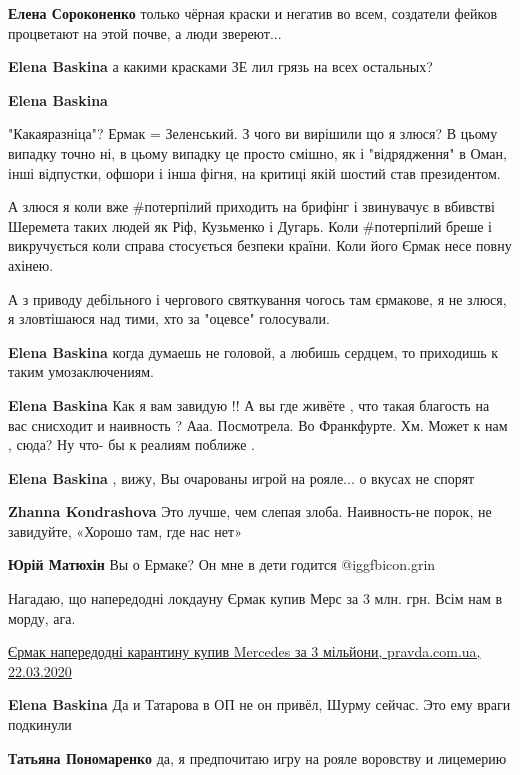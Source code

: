 \begin{itemize}
\begin{itemize}
\textbf{Елена Сороконенко} только чёрная краски и негатив во всем, создатели фейков процветают на этой почве, а люди звереют...

\textbf{Elena Baskina} а какими красками ЗЕ лил грязь на всех остальных?

\textbf{Elena Baskina} 

"Какаяразніца"? Ермак = Зеленський. З чого ви вирішили що я злюся? В цьому
випадку точно ні, в цьому випадку це просто смішно, як і "відрядження" в Оман,
інші відпустки, офшори і інша фігня, на критиці якій шостий став президентом.

А злюся я коли вже \#потерпілий приходить на брифінг і звинувачує в вбивстві
Шеремета таких людей як Ріф, Кузьменко і Дугарь. Коли #потерпілий бреше і
викручується коли справа стосується безпеки країни. Коли його Єрмак несе повну
ахінею.

А з приводу дебільного і чергового святкування чогось там єрмакове, я не злюся,
я зловтішаюся над тими, хто за "оцевсе" голосували.


\textbf{Elena Baskina} когда думаешь не головой, а любишь сердцем, то приходишь к таким умозаключениям.

\textbf{Elena Baskina} Как я вам завидую !! А вы где живёте , что такая благость на вас снисходит и наивность ? Ааа. Посмотрела. Во Франкфурте. Хм. Может к нам , сюда? Ну что- бы к реалиям поближе .

\textbf{Elena Baskina} , вижу, Вы очарованы игрой на рояле... о вкусах не спорят

\textbf{Zhanna Kondrashova} Это лучше, чем слепая злоба. Наивность-не порок, не завидуйте, «Хорошо там, где нас нет»

\textbf{Юрій Матюхін} Вы о Ермаке? Он мне в дети годится @igg{fbicon.grin} 


Нагадаю, що напередодні локдауну Єрмак купив Мерс за 3 млн. грн. Всім нам в
морду, ага. 

\href{http://www.pravda.com.ua/news/2020/03/22/7244597/}{%
Єрмак напередодні карантину купив Mercedes за 3 мільйони, pravda.com.ua, 22.03.2020%
}

\textbf{Elena Baskina} Да и Татарова в ОП не он привёл, Шурму сейчас. Это ему враги подкинули

\textbf{Татьяна Пономаренко} да, я предпочитаю игру на рояле воровству и лицемерию


\end{itemize}
\end{itemize}
